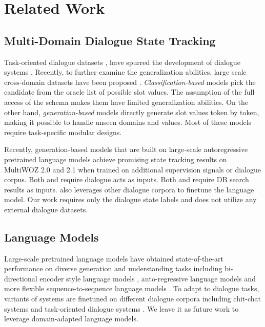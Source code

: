 \documentclass[11pt]{article}
\begin{document}
\section{Related Work}
\subsection{Multi-Domain Dialogue State Tracking}
Task-oriented dialogue datasets \cite{shah2018building,henderson2014second}, have spurred the development of dialogue systems \cite{zhong2018global,chao2019bert}. Recently, to further examine the generalization abilities, large scale cross-domain datasets have been proposed \cite{budzianowski2018multiwoz,zang2020multiwoz,eric2019multiwoz,rastogi2020towards}. 
\textit{Classification-based} models \cite{ye2021slot,chen2020schema} pick the candidate from the oracle list of possible slot values. The assumption of the full access of the schema makes them have limited generalization abilities. On the other hand, \textit{generation-based} models \cite{wu2019transferable,kim2020efficient,lin-etal-2020-mintl} directly generate slot values token by token, making it possible to handle unseen domains and values. Most of these models require task-specific modular designs.


Recently, generation-based models that are built on large-scale autoregressive pretrained language models \cite{ham2020end,hosseini2020simple,peng2020soloist} achieve
promising state tracking results on MultiWOZ 2.0 and 2.1 when trained on additional supervision signals or dialogue corpus.
Both \citet{ham2020end} and \citet{hosseini2020simple} require dialogue acts as inputs. Both \citet{hosseini2020simple} and \citet{peng2020soloist} require DB search results as inputs. \citet{peng2020soloist} also leverages other dialogue corpora to finetune the language model. Our work requires only the dialogue state labels and does not utilize any external dialogue datasets. 




\subsection{Language Models}
Large-scale pretrained language models have obtained state-of-the-art performance on diverse generation and understanding tasks including bi-directional encoder style language models \cite{devlin2019bert,liu2019roberta}, auto-regressive language models \cite{radford2019language,brown2020language} and more flexible sequence-to-sequence language models \cite{raffel2020exploring}.
To adapt to dialogue tasks, variants of systems are finetuned on different dialogue corpora including chit-chat systems \cite{zhang2020dialogpt,adiwardana2020towards,roller2020recipes} and task-oriented dialogue systems \cite{mehri2019pretraining,wu2020tod,henderson2020convert,peng2020few}. We leave it as future work to leverage domain-adapted language models.
\end{document}
